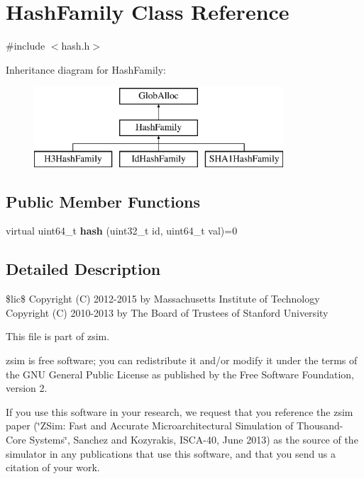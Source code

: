 \hypertarget{classHashFamily}{\section{Hash\-Family Class Reference}
\label{classHashFamily}
}


{\ttfamily \#include $<$hash.\-h$>$}

Inheritance diagram for Hash\-Family\-:\begin{figure}[H]
\begin{center}
\leavevmode
\includegraphics[height=3.000000cm]{classHashFamily}
\end{center}
\end{figure}
\subsection*{Public Member Functions}
\begin{DoxyCompactItemize}
\item 
\hypertarget{classHashFamily_adccfa4b4e61886a5b6ffc6e7797367e1}{virtual uint64\-\_\-t {\bfseries hash} (uint32\-\_\-t id, uint64\-\_\-t val)=0}\label{classHashFamily_adccfa4b4e61886a5b6ffc6e7797367e1}

\end{DoxyCompactItemize}


\subsection{Detailed Description}
\$lic\$ Copyright (C) 2012-\/2015 by Massachusetts Institute of Technology Copyright (C) 2010-\/2013 by The Board of Trustees of Stanford University

This file is part of zsim.

zsim is free software; you can redistribute it and/or modify it under the terms of the G\-N\-U General Public License as published by the Free Software Foundation, version 2.

If you use this software in your research, we request that you reference the zsim paper (\char`\"{}\-Z\-Sim\-: Fast and Accurate Microarchitectural Simulation of
\-Thousand-\/\-Core Systems\char`\"{}, Sanchez and Kozyrakis, I\-S\-C\-A-\/40, June 2013) as the source of the simulator in any publications that use this software, and that you send us a citation of your work.

